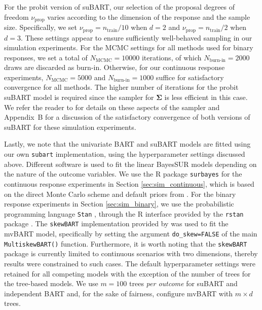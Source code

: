 \documentclass[aoas,preprint]{imsart}
\theoremstyle{plain}
\theoremstyle{definition}
\theoremstyle{remark}
\begin{document}
For the probit version of suBART, our selection of the proposal degrees of freedom $\nu_{\operatorname{prop}}$ varies according to the dimension of the response and the sample size. 
Specifically, we set $\nu_{\operatorname{prop}}=n_{\operatorname{train}}/10$ when $d=2$ and $\nu_{\operatorname{prop}}=n_{\operatorname{train}}/2$ when $d=3$. These settings appear to ensure sufficiently well-behaved sampling in our simulation experiments. For the MCMC settings for all methods used for binary responses, we set a total of $N_{\operatorname{MCMC}} = 10000$ iterations, of which $N_{\operatorname{burn-in}} = 2000$ draws are discarded as burn-in. Otherwise, for our continuous response experiments, $N_{\operatorname{MCMC}}=5000$ and $N_{\operatorname{burn-in}}=1000$ suffice for satisfactory convergence for all methods. The higher number of iterations for the probit suBART model is required since the sampler for $\boldsymbol{\Sigma}$ is less efficient in this case. We refer the reader to \citet{zhang2006sampling} for details on these aspects of the sampler
and Appendix~B for a discussion of the satisfactory convergence of both versions of suBART for these simulation experiments.

Lastly, we note 
that the univariate BART and suBART models are fitted using our own \texttt{subart} implementation, using the hyperparameter settings discussed above. Different software is used to fit the linear BayesSUR models depending on the nature of the outcome variables. We use the \textsf{R} package \texttt{surbayes} \citep{alt2020surbayes} for the continuous response experiments in Section \ref{sec:sim_continuous}, which is based on the direct Monte Carlo scheme and default priors from \citet{zellner2010direct}. For the binary response experiments in Section \ref{sec:sim_binary}, we use the probabilistic programming language \texttt{Stan} \citep{stanusersguide}, through the \textsf{R} interface provided by the \texttt{rstan} package \citep{rstanref}.
The \texttt{skewBART} implementation provided by \citet{um2023bayesian} was used to fit the mvBART model, specifically by setting the argument \texttt{do\_skew=FALSE} of the main \texttt{MultiskewBART()} function.  
Furthermore, it is worth noting that the \texttt{skewBART} package is currently limited to continuous scenarios with two dimensions, thereby results were constrained to such cases. The default hyperparameter settings were retained for all competing models with the exception of the number of trees for the tree-based models. We use $m=100$ trees \textit{per outcome} for suBART and independent BART and, for the sake of fairness, configure mvBART with $m \times d$ trees.
\end{document}
